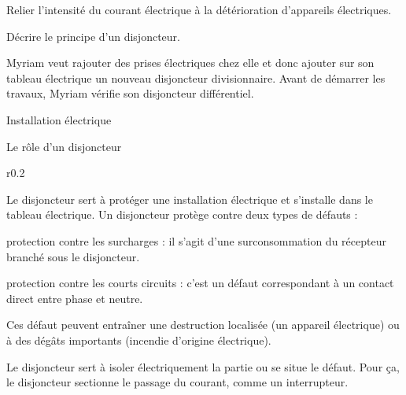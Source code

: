 \tetePremStssElec
\vspace*{-36pt}

\begin{objectifs}
  \item Relier l'intensité du courant électrique à la détérioration d'appareils électriques.
  \item Décrire le principe d'un disjoncteur.
\end{objectifs}



\begin{contexte}  
  Myriam veut rajouter des prises électriques chez elle et donc ajouter sur son tableau électrique un nouveau disjoncteur divisionnaire.
  Avant de démarrer les travaux, Myriam vérifie son disjoncteur différentiel.

\end{contexte}

\begin{doc}{Installation électrique}
  \begin{center}
    
  \end{center}
\end{doc}

\begin{doc}{Le rôle d'un disjoncteur}
  \begin{wrapfigure}[8]{r}{0.2\linewidth}
    \vspace*{-24pt}
    \centering
  \end{wrapfigure}
  Le disjoncteur sert à protéger une installation électrique et s'installe dans le tableau électrique.
  Un disjoncteur protège contre deux types de défauts :
  \begin{listePoints}
    \item protection contre les surcharges : il s'agit d'une surconsommation du récepteur branché sous le disjoncteur.
    \item protection contre les courts circuits : c'est un défaut correspondant à un contact direct entre phase et neutre.
  \end{listePoints}
  Ces défaut peuvent entraîner une destruction localisée (un appareil électrique) ou à des dégâts importants (incendie d'origine électrique).
  
  Le disjoncteur sert à isoler électriquement la partie ou se situe le défaut.
  Pour ça, le disjoncteur sectionne le passage du courant, comme un interrupteur.
\end{doc}


